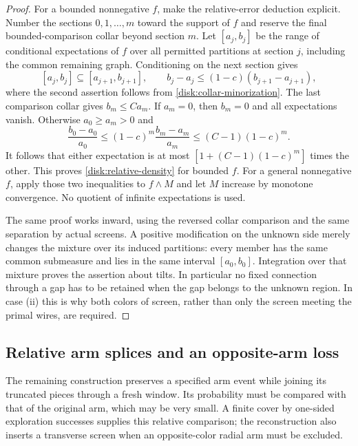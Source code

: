 \begin{proof}
For a bounded nonnegative $f$, make the relative-error deduction explicit.
Number the sections
$0,1,\ldots,m$ toward the support of $f$ and reserve the final
bounded-comparison collar beyond section $m$. Let
$[a_j,b_j]$ be the range of conditional expectations of $f$ over
all permitted partitions at section $j$, including the common
remaining graph. Conditioning on the next section gives
\[
 [a_j,b_j]\subseteq[a_{j+1},b_{j+1}],\qquad
 b_j-a_j\le(1-c)(b_{j+1}-a_{j+1}),
\]
where the second assertion follows from
\eqref{disk:collar-minorization}. The last comparison collar gives
$b_m\le C a_m$. If $a_m=0$, then $b_m=0$ and all expectations
vanish. Otherwise $a_0\ge a_m>0$ and
\[
 \frac{b_0-a_0}{a_0}
 \le (1-c)^m\frac{b_m-a_m}{a_m}
 \le (C-1)(1-c)^m.
\]
It follows that either expectation is at most
$[1+(C-1)(1-c)^m]$ times the other. This proves
\eqref{disk:relative-density} for bounded $f$. For a general
nonnegative $f$, apply those two inequalities to $f\wedge M$ and let
$M$ increase by monotone convergence. No quotient of infinite
expectations is used.

The same proof works inward, using the reversed collar comparison
and the same separation by actual screens. A positive modification
on the unknown side merely changes the mixture over its induced
partitions: every member has the same common submeasure and lies
in the same interval $[a_0,b_0]$. Integration over that mixture
proves the assertion about tilts. In particular no fixed connection
through a gap has to be retained when the gap belongs to the unknown
region. In case (ii) this is why both colors of screen, rather than
only the screen meeting the primal wires, are required.
\end{proof}

\subsection{Relative arm splices and an opposite-arm loss}

The remaining construction preserves a specified arm event while
joining its truncated pieces through a fresh window. Its probability
must be compared with that of the original arm, which may be very
small. A finite cover by one-sided exploration successes supplies this
relative comparison; the reconstruction also inserts a transverse
screen when an opposite-color radial arm must be excluded.

